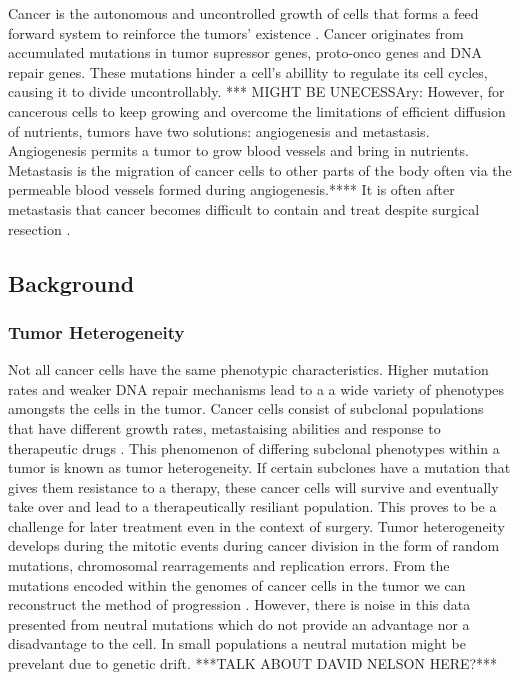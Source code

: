 \documentclass[12pt]{article}
\begin{document}
Cancer is the autonomous and uncontrolled growth of cells that forms a feed forward system to reinforce the tumors’ existence \cite{hallmarks}. Cancer originates from accumulated mutations in tumor supressor genes, proto-onco genes and DNA repair genes. These mutations hinder a cell's abillity to regulate its cell cycles, causing it to divide uncontrollably. *** MIGHT BE UNECESSAry: However, for cancerous cells to keep growing and overcome the limitations of efficient diffusion of nutrients, tumors have two solutions: angiogenesis and metastasis. Angiogenesis permits a tumor to grow blood vessels and bring in nutrients. Metastasis is the migration of cancer cells to other parts of the body often via the permeable blood vessels formed during angiogenesis.**** It is often after metastasis that cancer becomes difficult to contain and treat despite surgical resection \cite{Demicheli2008}.

\subsection{Background}
\subsubsection{Tumor Heterogeneity}
Not all cancer cells have the same phenotypic characteristics. Higher mutation rates and weaker DNA repair mechanisms lead to a a wide variety of phenotypes amongsts the cells in the tumor. Cancer cells consist of subclonal populations that have different growth rates, metastaising abilities and response to therapeutic drugs \cite{Heppner1983}. This phenomenon of differing subclonal phenotypes within a tumor is known as tumor heterogeneity. If certain subclones have a mutation that gives them resistance to a therapy, these cancer cells will survive and eventually take over and lead to a therapeutically resiliant population. This proves to be a challenge for later treatment even in the context of surgery. Tumor heterogeneity develops during the mitotic events during cancer division in the form of random mutations, chromosomal rearragements and replication errors. From the mutations encoded within the genomes of cancer cells in the tumor we can reconstruct the method of progression \cite{Naxerova2015}. However, there is noise in this data presented from neutral mutations which do not provide an advantage nor a disadvantage to the cell. In small populations a neutral mutation might be prevelant due to genetic drift. ***TALK ABOUT DAVID NELSON HERE?***
\end{document}
